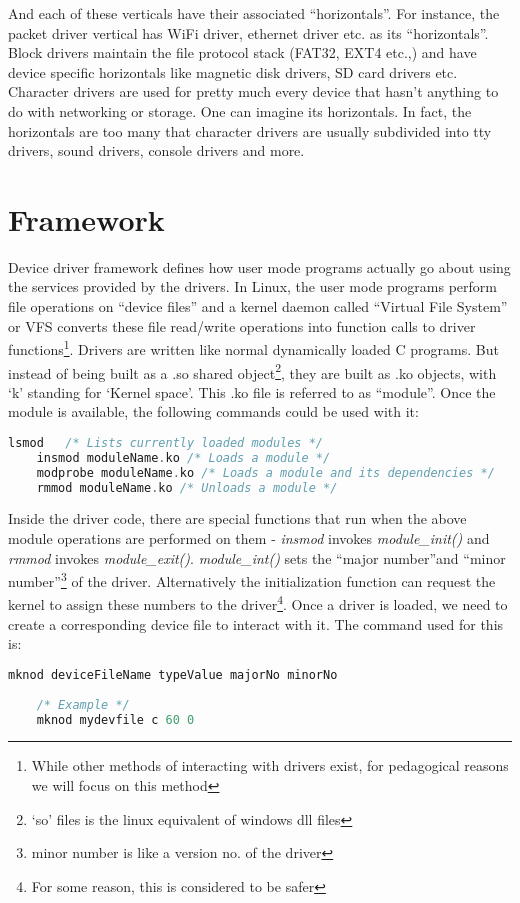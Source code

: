 And each of these verticals have their associated ``horizontals''. For instance, the packet driver vertical has WiFi driver, ethernet driver etc. as its ``horizontals''. Block drivers maintain the file protocol stack (FAT32, EXT4 etc.,) and have device specific horizontals like magnetic disk drivers, SD card drivers etc. Character drivers are used for pretty much every device that hasn't anything to do with networking or storage. One can imagine its horizontals. In fact, the horizontals are too many that character drivers are usually subdivided into tty drivers, sound drivers, console drivers and more. 

\section{Framework}
Device driver framework defines how user mode programs actually go about using the services provided by the drivers. In Linux, the user mode programs perform file operations on ``device files'' and a kernel daemon called ``Virtual File System'' or VFS converts these file read/write operations into function calls to driver functions\footnote{While other methods of interacting with drivers exist, for pedagogical reasons we will focus on this method}. Drivers are written like normal dynamically loaded C programs. But instead of being built as a .so shared object\footnote{`so' files is the linux equivalent of windows dll files}, they are built as .ko objects, with `k' standing for `Kernel space'. This .ko file is referred to as ``module''. Once the module is available, the following commands could be used with it:

	\begin{lstlisting}[language = C]
	lsmod 	/* Lists currently loaded modules */
	insmod moduleName.ko /* Loads a module */
	modprobe moduleName.ko /* Loads a module and its dependencies */
	rmmod moduleName.ko /* Unloads a module */
	\end{lstlisting}

Inside the driver code, there are special functions that run when the above module operations are performed on them - \emph{insmod} invokes \emph{module\_init()} and \emph{rmmod} invokes \emph{module\_exit()}. \emph{module\_int()} sets the ``major number''and ``minor number''\footnote{minor number is like a version no. of the driver} of the driver. Alternatively the initialization function can request the kernel to assign these numbers to the driver\footnote{For some reason, this is considered to be safer}. Once a driver is loaded, we need to create a corresponding device file to interact with it. The command used for this is:
	\begin{lstlisting}[language = C]
  	mknod deviceFileName typeValue majorNo minorNo
  	
  	/* Example */
  	mknod mydevfile c 60 0 
  	\end{lstlisting}

